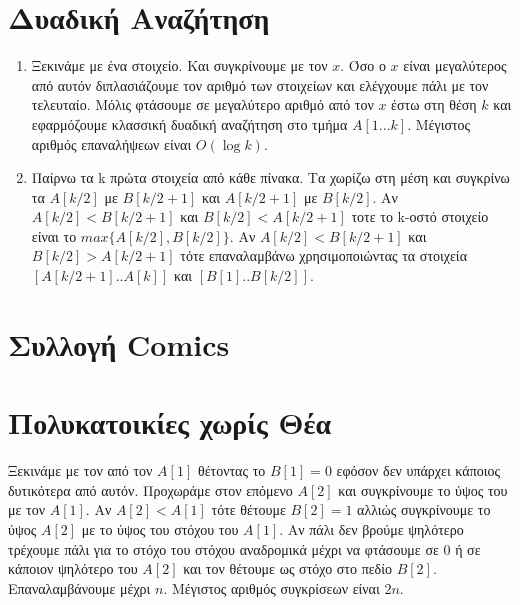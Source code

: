 \documentclass[a4paper,10pt]{article} \usepackage{anysize}
\begin{document}
\section{Δυαδική Αναζήτηση}
\begin{enumerate}
\item Ξεκινάμε με ένα στοιχείο. Και συγκρίνουμε με τον $x$. Όσο ο $x$ είναι
μεγαλύτερος από αυτόν διπλασιάζουμε τον αριθμό των στοιχείων και ελέγχουμε
πάλι με τον τελευταίο. Μόλις φτάσουμε σε μεγαλύτερο αριθμό από τον $x$ έστω
στη θέση $k$ και εφαρμόζουμε κλασσική δυαδική αναζήτηση στο τμήμα $A[1...k]$. 
Μέγιστος αριθμός επαναλήψεων είναι $O(\log{k})$.
\item Παίρνω τα k πρώτα στοιχεία από κάθε πίνακα. Τα χωρίζω στη μέση και
συγκρίνω τα $A[k/2]$ με $B[k/2+1]$ και $A[k/2+1]$ με $B[k/2]$. Αν
$A[k/2]<B[k/2+1]$ και $B[k/2]<A[k/2+1]$ τοτε το k-οστό στοιχείο είναι το
$max\{A[k/2],B[k/2]\}$. Αν $A[k/2]<B[k/2+1]$ και $B[k/2]>A[k/2+1]$ τότε
επαναλαμβάνω χρησιμοποιώντας τα στοιχεία $[A[k/2+1]..A[k]]$ και
$[B[1]..B[k/2]]$.
\end{enumerate}
\section{Συλλογή Comics}
\section{Πολυκατοικίες χωρίς Θέα}
Ξεκινάμε με τον από τον $A[1]$ θέτοντας το $B[1]=0$ εφόσον δεν υπάρχει κάποιος
δυτικότερα από αυτόν. Προχωράμε στον επόμενο $A[2]$ και συγκρίνουμε το ύψος
του με τον $A[1]$. Αν $A[2]<A[1]$ τότε θέτουμε $B[2]=1$ αλλιώς συγκρίνουμε το
ύψος $A[2]$ με το ύψος του στόχου του $A[1]$. Αν πάλι δεν βρούμε ψηλότερο
τρέχουμε πάλι για το στόχο του στόχου αναδρομικά μέχρι να φτάσουμε σε 0
ή σε κάποιον ψηλότερο του $A[2]$ και τον θέτουμε ως στόχο στο πεδίο $B[2]$.
Επαναλαμβάνουμε μέχρι $n$. Μέγιστος αριθμός συγκρίσεων είναι $2n$.
\end{document}

